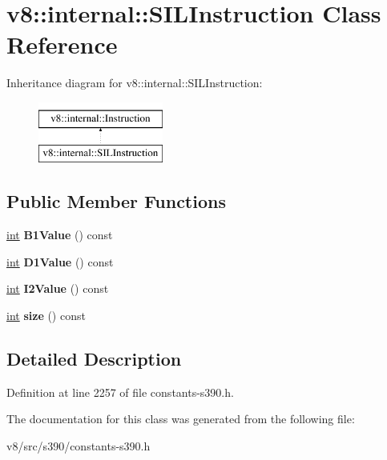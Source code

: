 \hypertarget{classv8_1_1internal_1_1SILInstruction}{}\section{v8\+:\+:internal\+:\+:S\+I\+L\+Instruction Class Reference}
\label{classv8_1_1internal_1_1SILInstruction}
Inheritance diagram for v8\+:\+:internal\+:\+:S\+I\+L\+Instruction\+:\begin{figure}[H]
\begin{center}
\leavevmode
\includegraphics[height=2.000000cm]{classv8_1_1internal_1_1SILInstruction}
\end{center}
\end{figure}
\subsection*{Public Member Functions}
\begin{DoxyCompactItemize}
\item 
\mbox{\label{classv8_1_1internal_1_1SILInstruction_a574b4db9fe6bc125dd10fb1367fc0836}} 
\mbox{\hyperlink{classint}{int}} {\bfseries B1\+Value} () const
\item 
\mbox{\label{classv8_1_1internal_1_1SILInstruction_a07acb906c257e59b6328015c04dcd2c0}} 
\mbox{\hyperlink{classint}{int}} {\bfseries D1\+Value} () const
\item 
\mbox{\label{classv8_1_1internal_1_1SILInstruction_a661e9a75251321b728e205cba3a159f2}} 
\mbox{\hyperlink{classint}{int}} {\bfseries I2\+Value} () const
\item 
\mbox{\label{classv8_1_1internal_1_1SILInstruction_aac7e17d8ce5143c1c1c881da98675423}} 
\mbox{\hyperlink{classint}{int}} {\bfseries size} () const
\end{DoxyCompactItemize}


\subsection{Detailed Description}


Definition at line 2257 of file constants-\/s390.\+h.



The documentation for this class was generated from the following file\+:\begin{DoxyCompactItemize}
\item 
v8/src/s390/constants-\/s390.\+h\end{DoxyCompactItemize}
